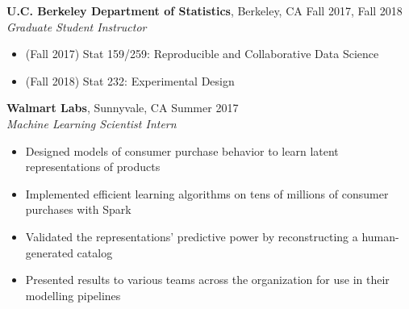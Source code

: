 \documentclass{res}
\begin{document}
\begin{resume}
\textbf{U.C. Berkeley Department of Statistics}, Berkeley, CA  \hfill{Fall 2017, Fall 2018}\\
\textit{Graduate Student Instructor}
\begin{itemize}
\item (Fall 2017) Stat 159/259: Reproducible and Collaborative Data Science
\item (Fall 2018) Stat 232: Experimental Design  
\end{itemize}  
\vspace{-2mm}  
\textbf{Walmart Labs}, Sunnyvale, CA \hfill{Summer 2017}\\
\textit{Machine Learning Scientist Intern}
\begin{itemize}
\item Designed models of consumer purchase behavior to learn latent representations of products
\item Implemented efficient learning algorithms on tens of millions of consumer purchases with Spark
\item Validated the representations' predictive power by reconstructing a human-generated catalog
\item Presented results to various teams across the organization for use in their modelling pipelines
\end{itemize}



\end{resume}
\end{document}
